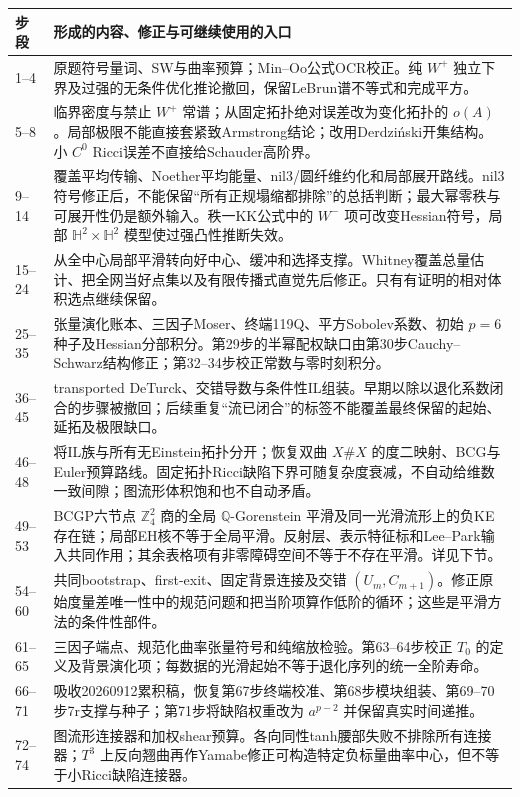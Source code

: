 \documentclass[UTF8,a4paper,11pt,fontset=fandol]{ctexart}
\numberwithin{equation}{section}
\theoremstyle{definition}
\begin{document}
\begin{longtable}{L{.12\textwidth}L{.79\textwidth}}
\toprule 步段 & 形成的内容、修正与可继续使用的入口\\\midrule{}--4 & 原题符号量词、SW与曲率预算；Min--Oo公式OCR校正。纯 $W^+$ 独立下界及过强的无条件优化推论撤回，保留LeBrun谱不等式和完成平方。\\
5--8 & 临界密度与禁止 $W^+$ 常谱；从固定拓扑绝对误差改为变化拓扑的 $o(A)$。局部极限不能直接套紧致Armstrong结论；改用Derdzi\'nski开集结构。小 $C^0$ Ricci误差不直接给Schauder高阶界。\\
9--14 & 覆盖平均传输、Noether平均能量、nil3/圆纤维约化和局部展开路线。nil3符号修正后，不能保留“所有正规塌缩都排除”的总括判断；最大幂零秩与可展开性仍是额外输入。秩一KK公式中的 $W^-$ 项可改变Hessian符号，局部 $\mathbb H^2\times\mathbb H^2$ 模型使过强凸性推断失效。\\
15--24 & 从全中心局部平滑转向好中心、缓冲和选择支撑。Whitney覆盖总量估计、把全网当好点集以及有限传播式直觉先后修正。只有有证明的相对体积选点继续保留。\\
25--35 & 张量演化账本、三因子Moser、终端119Q、平方Sobolev系数、初始 $p=6$ 种子及Hessian分部积分。第29步的半幂配权缺口由第30步Cauchy--Schwarz结构修正；第32--34步校正常数与零时刻积分。\\
36--45 & transported DeTurck、交错导数与条件性IL组装。早期以除以退化系数闭合的步骤被撤回；后续重复“流已闭合”的标签不能覆盖最终保留的起始、延拓及极限缺口。\\
46--48 & 将IL族与所有无Einstein拓扑分开；恢复双曲 $X\#X$ 的度二映射、BCG与Euler预算路线。固定拓扑Ricci缺陷下界可随复杂度衰减，不自动给维数一致间隙；图流形体积饱和也不自动矛盾。\\
49--53 & BCGP六节点 $\mathbb Z_4^2$ 商的全局 $\mathbb Q$-Gorenstein 平滑及同一光滑流形上的负KE存在链；局部EH核不等于全局平滑。反射层、表示特征标和Lee--Park输入共同作用；其余表格项有非零障碍空间不等于不存在平滑。详见下节。\\
54--60 & 共同bootstrap、first-exit、固定背景连接及交错 $(U_m,C_{m+1})$。修正原始度量差唯一性中的规范问题和把当阶项算作低阶的循环；这些是平滑方法的条件性部件。\\
61--65 & 三因子端点、规范化曲率张量符号和纯缩放检验。第63--64步校正 $T_0$ 的定义及背景演化项；每数据的光滑起始不等于退化序列的统一全阶寿命。\\
66--71 & 吸收20260912累积稿，恢复第67步终端校准、第68步模块组装、第69--70步7r支撑与种子；第71步将缺陷权重改为 $a^{p-2}$ 并保留真实时间递推。\\
72--74 & 图流形连接器和加权shear预算。各向同性tanh腰部失败不排除所有连接器；$T^3$ 上反向翘曲再作Yamabe修正可构造特定负标量曲率中心，但不等于小Ricci缺陷连接器。\\

\end{longtable}
\end{document}
